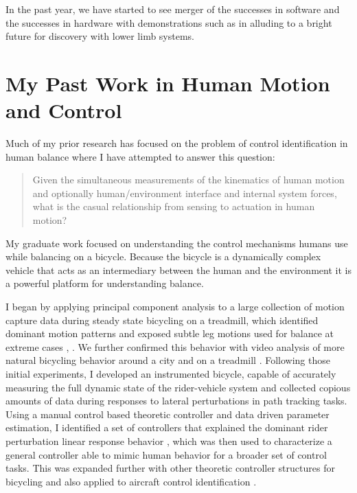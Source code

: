 \documentclass[letter,titlepage]{article}
\begin{document}
In the past year, we have started to see merger of the successes in software
and the successes in hardware with demonstrations such as in \cite{OpenAI2018}
alluding to a bright future for discovery with lower limb systems.



\section{My Past Work in Human Motion and Control%
  \label{my-past-work-in-human-motion-and-control}%
}

Much of my prior research has focused on the problem of control identification
in human balance where I have attempted to answer this question:

\begin{quote}
Given the simultaneous measurements of the kinematics of human motion and
optionally human/environment interface and internal system forces, what is
the casual relationship from sensing to actuation in human motion?
\end{quote}

My graduate work focused on understanding the control mechanisms humans use
while balancing on a bicycle. Because the bicycle is a dynamically complex
vehicle \cite{Astrom2005,Meijaard2007,Moore2007,Moore2008} that acts as an
intermediary between the human and the environment it is a powerful platform
for understanding balance.

I began by applying principal component analysis to a large collection of
motion capture data during steady state bicycling on a treadmill, which
identified dominant motion patterns and exposed subtle leg motions used for
balance at extreme cases \cite{Moore2009a}, \cite{Moore2011c}. We further confirmed
this behavior with video analysis of more natural bicycling behavior around a
city and on a treadmill \cite{Kooijman2009}. Following those initial experiments, I
developed an instrumented bicycle, capable of accurately measuring the full
dynamic state of the rider-vehicle system \cite{Moore2012,Moore2013} and
collected copious amounts of data during responses to lateral perturbations in
path tracking tasks. Using a manual control based theoretic controller
\cite{Hess2012} and data driven parameter estimation, I identified a set of
controllers that explained the dominant rider perturbation linear response
behavior \cite{Moore2012}, which was then used to characterize a general controller
able to mimic human behavior for a broader set of control tasks. This was
expanded further with other theoretic controller structures for bicycling
\cite{Schwab2012a,Schwab2012,Schwab2013} and also applied to aircraft control
identification \cite{Hess2013}.
\end{document}

